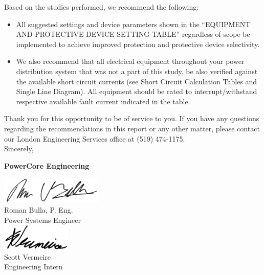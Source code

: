 Based on the studies performed, we recommend the following:
\begin{itemize}
	\item All suggested settings and device parameters shown in the “EQUIPMENT AND PROTECTIVE DEVICE SETTING TABLE” regardless of scope be implemented to achieve improved protection and protective device selectivity.
	\item We also recommend that all electrical equipment throughout your power distribution system that was not a part of this study, be also verified against the available short circuit currents (see Short Circuit Calculation Tables and Single Line Diagram). All equipment should be rated to interrupt/withstand respective
available fault current indicated in the table.
\end{itemize}

\vspace{10mm}
\noindent Thank you for this opportunity to be of service to you.  If you have any questions regarding the recommendations in this report or any other matter, please contact our London Engineering Services office at (519) 474-1175. \newline
\vspace{5mm}
\\
\noindent Sincerely,\newline

\vspace{5mm}
\noindent\textbf{PowerCore Engineering}\newline

\begin{multicols}{2}
\centering
\includegraphics[height=0.5in, keepaspectratio=true]{../Images/Roman_signature.jpg} \\
Roman Bulla, P. Eng. \\Power Systems Engineer \\
\includegraphics[height=0.5in, keepaspectratio=true]{../Images/Scott_signature.jpg} \\
Scott Vermeire \\Engineering Intern \\
\end{multicols}

